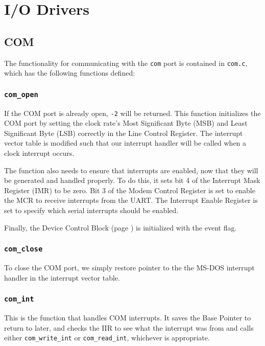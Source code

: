 \section{I/O Drivers}

\subsection{COM}
The functionality for communicating with the {\tt com} port is contained in {\tt com.c}, which has the following functions defined:

\subsubsection{\tt com\_open}

If the COM port is already open, {\tt -2} will be returned. This function initializes the COM port by setting the clock rate's Most Significant Byte (MSB) and Least Significant Byte (LSB) correctly in the Line Control Register. The interrupt vector table is modified such that our interrupt handler will be called when a clock interrupt occurs.

The function also needs to ensure that interrupts are enabled, now that they will be generated and handled properly. To do this, it sets bit 4 of the Interrupt Mask Register (IMR) to be zero. Bit 3 of the Modem Control Register is set to enable the MCR to receive interrupts from the UART. The Interrupt Enable Register is set to specify which serial interrupts should be enabled.

Finally, the Device Control Block (page \pageref{device_control_block}) is initialized with the event flag.

\subsubsection{\tt com\_close}

To close the COM port, we simply restore pointer to the the MS-DOS interrupt handler in the interrupt vector table.

\subsubsection{\tt com\_int}

This is the function that handles COM interrupts. It saves the Base Pointer to return to later, and checks the IIR to see what the interrupt was from and calls either {\tt com\_write\_int} or {\tt com\_read\_int}, whichever is appropriate.

